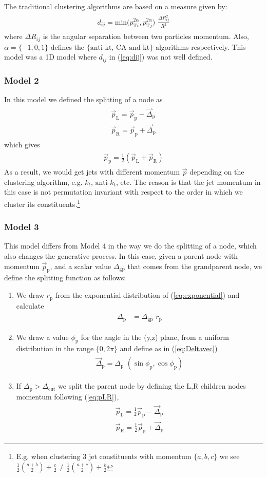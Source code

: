 \documentclass[12pt]{article}
\newcommand{\bea}{\begin{eqnarray}\begin{aligned}}
\newcommand{\eea}{\end{aligned}\end{eqnarray}}
\begin{document}
The traditional clustering algorithms are based on a measure given by:
\bea\label{eq:dij}
d_{ij}= \text{min}({p_{\text{T}i}^{2\alpha}, {p_{\text{T}j}^{2\alpha}})\,\, \frac{\Delta R_{ij}^2}{R^2}}
\eea
where $\Delta R_{ij}$ is the angular separation between two particles momentum. Also, $\alpha=\{-1,0,1\}$ defines the $\{\text{anti-kt, CA and kt}\}$ algorithms respectively. 
This model was a 1D model where $d_{ij}$ in (\ref{eq:dij}) was not well defined.

\subsubsection{Model 2}

In this model we defined the splitting of a node as
\bea\label{eq:pLRb}
\vec{p}_\text{L}= \vec{p}_\text{p} - \vec{\Delta}_\text{p}  \\
\vec{p}_\text{R}= \vec{p}_\text{p} +\vec{\Delta}_\text{p}
\eea
which gives
\bea
\vec{p}_\text{p}= \frac{1}{2} (\vec{p}_\text{L} + \vec{p}_\text{R} ) 
\eea
As a result, we would get jets with different momentum $\vec{p}$ depending on the clustering algorithm, e.g. $k_t$, $\text{anti-}k_t$, etc. The reason is that the jet momentum in this case is not permutation invariant with respect to the order in which we cluster its constituents.\footnote{E.g. when clustering 3 jet constituents with momentum $\{a,b,c\}$ we see $\frac{1}{2}(\frac{a+b}{2})+\frac{c}{2} \neq \frac{1}{2}(\frac{a+c}{2})+\frac{b}{2}$}

\subsubsection{Model 3}

This model differs from Model 4 in the way we do the splitting of a node, which also changes the generative process. In this case, given a parent node with momentum $\vec{p}_\text{p}$, and a scalar value $\Delta_{\text{gp}}$ that comes from the grandparent node, we define the splitting function as follows:
\begin{enumerate}

\item We draw $r_\text{p}$ from the exponential distribution of (\ref{eq:exponential}) and calculate
\bea\label{rp}
\Delta_\text{p} &= \Delta_\text{gp} \,\, r_\text{p}
\eea

\item We draw a value $\phi_\text{p}$ for the angle in the (y,z) plane, from a uniform distribution in the range $\{0,2\pi\}$ and define as in (\ref{eq:Deltavec})
\bea
\vec{\Delta}_\text{p}= \Delta_\text{p}\,\,(\sin\phi_\text{p},\cos\phi_\text{p})\nonumber
\eea 

\item If $\Delta_\text{p} > \Delta_\text{cut}$ we split the parent node by defining the L,R children nodes momentum following (\ref{eq:pLR}),
\bea
\vec{p}_\text{L}= \frac{1}{2} \vec{p}_\text{p} - \vec{\Delta}_\text{p}  \\
\vec{p}_\text{R}= \frac{1}{2} \vec{p}_\text{p} +\vec{\Delta}_\text{p} \nonumber
\eea

\end{enumerate}
\end{document}
